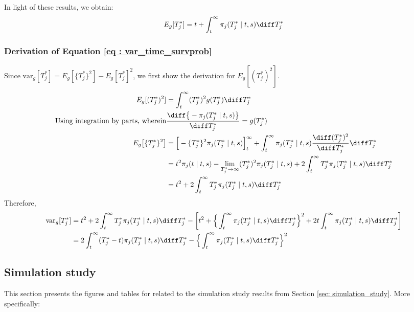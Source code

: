 In light of these results, we obtain:
\begin{equation*}
E_g[T^*_j] = t + \int_t^{\infty} \pi_j(T^*_j \mid t, s) \diff T^*_j\\
\end{equation*}

\subsubsection{Derivation of Equation \ref{eq : var_time_survprob}}
Since $\mbox{var}_g[T^*_j] = E_g[\{T^*_j\}^2] - E_g[T^*_j]^2$, we first show the derivation for $E_g[(T^*_j)^2]$.
\begin{equation*}
\begin{split}
E_g[(T^*_j)^2] &= \int_t^{\infty} (T^*_j)^2 g(T^*_j)\diff T^*_j\\
\text{Using integration by parts, wherein} & \frac{\diff \big\{-\pi_j(T^*_j \mid t, s)\big\}}{\diff T^*_j} = g(T^*_j)\\
E_g\big[\{T^*_j\}^2\big] &= \Big[-\{T^*_j\}^2\pi_j(T^*_j \mid t, s)\Big]_t^\infty + \int_t^{\infty} \pi_j(T^*_j \mid t, s) \frac{\diff (T^*_j)^2}{\diff T^*_j} \diff T^*_j\\
&= t^2 \pi_j(t \mid t, s) - \lim_{T^*_j\to \infty}(T^*_j)^2 \pi_j(T^*_j \mid t, s) + 2 \int_t^{\infty} T^*_j \pi_j(T^*_j \mid t, s) \diff T^*_j\\
&= t^2 + 2 \int_t^{\infty} T^*_j \pi_j(T^*_j \mid t, s) \diff T^*_j
\end{split}
\end{equation*}
Therefore,
\begin{equation*}
\begin{split}
\mbox{var}_g[T^*_j] &= t^2 + 2 \int_t^{\infty} T^*_j \pi_j(T^*_j \mid t, s) \diff T^*_j - \bigg[t^2 +  \Big\{\int_t^\infty \pi_j(T^*_j \mid t, s) \diff T^*_j \Big\}^2 + 2t\int_t^\infty \pi_j(T^*_j \mid t, s) \diff T^*_j \bigg]\\
&=2 \int_t^{\infty} (T^*_j - t) \pi_j(T^*_j \mid t, s) \diff T^*_j -  \Big\{\int_t^\infty \pi_j(T^*_j \mid t, s) \diff T^*_j \Big\}^2
\end{split}
\end{equation*}

\subsection{Simulation study}
This section presents the figures and tables for related to the simulation study results from Section \ref{sec: simulation_study}. More specifically:

